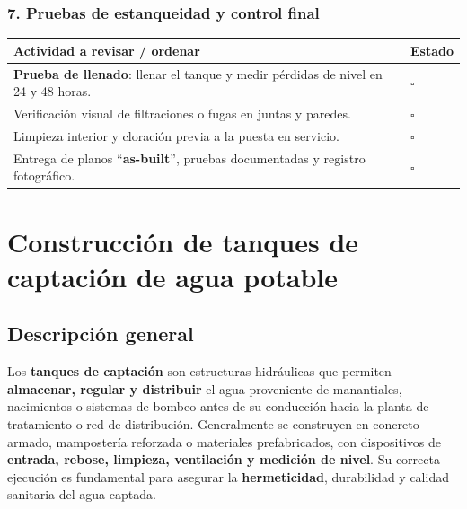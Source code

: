 \documentclass[12pt]{article}
\newcommand{\cbox}{\(\square\)} %
\begin{document}
	\subsubsection*{7. Pruebas de estanqueidad y control final}
	\begin{tabularx}{\linewidth}{>{\raggedright\arraybackslash}p{0.93\linewidth} >{\centering\arraybackslash}m{0.07\linewidth}}
		\toprule
		\textbf{Actividad a revisar / ordenar} & \textbf{Estado}\\
		\midrule
		\textbf{Prueba de llenado}: llenar el tanque y medir pérdidas de nivel en 24 y 48 horas. & \cbox \\
		Verificación visual de filtraciones o fugas en juntas y paredes. & \cbox \\
		Limpieza interior y cloración previa a la puesta en servicio. & \cbox \\
		Entrega de planos “\textbf{as-built}”, pruebas documentadas y registro fotográfico. & \cbox \\
		\bottomrule
	\end{tabularx}
	












	\section{Construcción de tanques de captación de agua potable}
	
	\subsection*{Descripción general}
	Los \textbf{tanques de captación} son estructuras hidráulicas que permiten \textbf{almacenar, regular y distribuir} el agua proveniente de manantiales, nacimientos o sistemas de bombeo antes de su conducción hacia la planta de tratamiento o red de distribución.  
	Generalmente se construyen en concreto armado, mampostería reforzada o materiales prefabricados, con dispositivos de \textbf{entrada, rebose, limpieza, ventilación y medición de nivel}.  
	Su correcta ejecución es fundamental para asegurar la \textbf{hermeticidad}, durabilidad y calidad sanitaria del agua captada.
	

	
\end{document}
